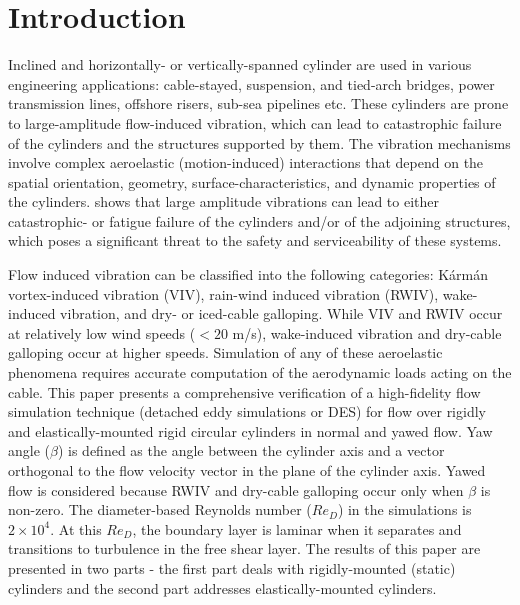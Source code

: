 \section{Introduction}
\label{sec:intro}
%
Inclined and horizontally- or vertically-spanned cylinder are used in various
engineering applications: cable-stayed, suspension, and tied-arch bridges,
power transmission lines, offshore risers, sub-sea pipelines etc. These
cylinders are prone to large-amplitude flow-induced vibration, which can lead
to catastrophic failure of the cylinders and the structures supported by them.
The vibration mechanisms involve complex aeroelastic (motion-induced)
interactions that depend on the spatial orientation, geometry,
surface-characteristics, and dynamic properties of the cylinders.
\cite{davenport1995dynamics} shows that large amplitude vibrations can lead to
either catastrophic- or fatigue failure of the cylinders and/or of the
adjoining structures, which poses a significant threat to the safety and
serviceability of these systems.

Flow induced vibration can be classified into the following categories:
K\'arm\'an vortex-induced vibration (VIV), rain-wind induced vibration (RWIV),
wake-induced vibration, and dry- or iced-cable galloping. While VIV and RWIV
occur at relatively low wind speeds ($<20$ m/s), wake-induced vibration and
dry-cable galloping occur at higher speeds. Simulation of any of these
aeroelastic phenomena requires accurate computation of the aerodynamic loads
acting on the cable.  This paper presents a comprehensive verification of a
high-fidelity flow simulation technique (detached eddy simulations or DES) for
flow over rigidly and elastically-mounted rigid circular cylinders in normal
and yawed flow. Yaw angle ($\beta$) is defined as the angle between the
cylinder axis and a vector orthogonal to the flow velocity vector in the plane
of the cylinder axis. Yawed flow is considered because RWIV and dry-cable
galloping occur only when $\beta$ is non-zero. The diameter-based Reynolds
number ($Re_D$) in the simulations is $2\times 10^4$. At this $Re_D$, the
boundary layer is laminar when it separates and transitions to turbulence in
the free shear layer. The results of this paper are presented in two parts -
the first part deals with rigidly-mounted (static) cylinders and the second
part addresses elastically-mounted cylinders.

